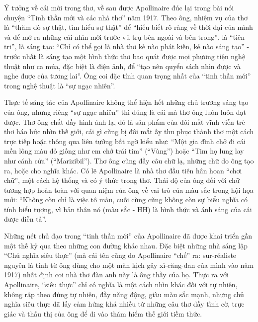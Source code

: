\documentclass[../main.tex]{subfiles}
\begin{document}
\begin{multicols}{2}
Ý tưởng về cái mới trong thơ, về sau được Apollinaire đúc lại trong bài nói chuyện “Tinh thần mới và các nhà thơ” năm 1917. Theo ông, nhiệm vụ của thơ là “thăm dò sự thật, tìm hiểu sự thật” để “hiểu biết rõ ràng về thời đại của mình và để mở ra những cái nhìn mới trước vũ trụ bên ngoài và bên trong”, là “tiên tri”, là sáng tạo: “Chỉ có thể gọi là nhà thơ kẻ nào phát kiến, kẻ nào sáng tạo” - trước nhất là sáng tạo một hình thức thơ bao quát được mọi phương tiện nghệ thuật như ca múa, đặc biệt là điện ảnh, để “tạo nên quyển sách nhìn được và nghe được của tương lai”. Ông coi đặc tính quan trọng nhất của “tinh thần mới” trong nghệ thuật là “sự ngạc nhiên”. 
 
Thực tế sáng tác của Apollinaire không thể hiện hết những chủ trương sáng tạo của ông, nhưng riêng “sự ngạc nhiên” thì đúng là cái mà thơ ông luôn luôn đạt được. Thơ ông chất đầy hình ảnh lạ, đó là sản phẩm của đôi mắt vĩnh viễn trẻ thơ háo hức nhìn thế giới, cái gì cũng bị đôi mắt ấy thu phục thành thơ một cách trực tiếp hoặc thông qua liên tưởng bất ngờ kiểu như: “Một gia đình chở đi cái mền lông màu đỏ giống như em chở trái tim” (“Vùng”) hoặc “Tim họ lung lay như cánh cửa” (“Marizibil”). Thơ ông cũng đầy câu chữ lạ, những chữ do ông tạo ra, hoặc cho nghĩa khác. Có lẽ Apollinaire là nhà thơ đầu tiên hân hoan “chơi chữ”, một cách hệ thống và có ý thức trong thơ. Thái độ của ông đối với chữ tương hợp hoàn toàn với quan niệm của ông về vai trò của màu sắc trong hội họa mới: “Không còn chỉ là việc tô màu, cuối cùng cũng không còn sự biểu nghĩa có tính biểu tượng, vì bản thân nó (màu sắc - HH) là hình thức và ánh sáng của cái được diễn tả”. 
 
Những nét chủ đạo trong “tinh thần mới” của Apollinaire đã được khai triển gần một thế kỷ qua theo những con đường khác nhau. Đặc biệt những nhà sáng lập “Chủ nghĩa siêu thực” (mà cái tên cũng do Apollinaire “chế” ra: sur-réaliste nguyên là tính từ ông dùng cho một màn kịch gây xì-căng-đan của mình vào năm 1917) nhất định coi nhà thơ đàn anh này là ông thầy của họ. Thực ra với Apollinaire, “siêu thực” chỉ có nghĩa là một cách nhìn khác đối với tự nhiên, không rập theo đúng tự nhiên, đầy năng động, giàu màu sắc mạnh, nhưng chủ nghĩa siêu thực đã lấy cảm hứng khá nhiều từ những câu thơ đầy tình cờ, trực giác và thấu thị của ông để đi vào thám hiểm thế giới tiềm thức. 
 

\end{multicols}
\end{document}
